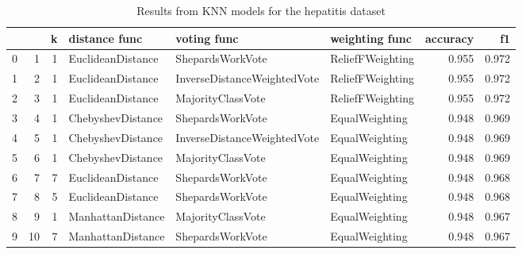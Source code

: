 \begin{table}
\centering
\caption{Results from KNN models for the hepatitis dataset}
\begin{tabular}{lrrlllrr}
\toprule
 &  & k & distance func & voting func & weighting func & accuracy & f1 \\
\midrule
0 & 1 & 1 & EuclideanDistance & ShepardsWorkVote & ReliefFWeighting & 0.955 & 0.972 \\
1 & 2 & 1 & EuclideanDistance & InverseDistanceWeightedVote & ReliefFWeighting & 0.955 & 0.972 \\
2 & 3 & 1 & EuclideanDistance & MajorityClassVote & ReliefFWeighting & 0.955 & 0.972 \\
3 & 4 & 1 & ChebyshevDistance & ShepardsWorkVote & EqualWeighting & 0.948 & 0.969 \\
4 & 5 & 1 & ChebyshevDistance & InverseDistanceWeightedVote & EqualWeighting & 0.948 & 0.969 \\
5 & 6 & 1 & ChebyshevDistance & MajorityClassVote & EqualWeighting & 0.948 & 0.969 \\
6 & 7 & 7 & EuclideanDistance & ShepardsWorkVote & EqualWeighting & 0.948 & 0.968 \\
7 & 8 & 5 & EuclideanDistance & ShepardsWorkVote & EqualWeighting & 0.948 & 0.968 \\
8 & 9 & 1 & ManhattanDistance & MajorityClassVote & EqualWeighting & 0.948 & 0.967 \\
9 & 10 & 7 & ManhattanDistance & ShepardsWorkVote & EqualWeighting & 0.948 & 0.967 \\
\bottomrule
\end{tabular}
\end{table}
